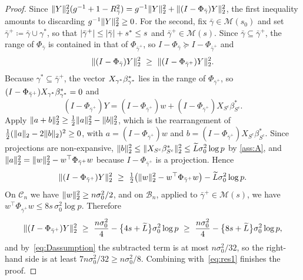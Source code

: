 \begin{proof}
    Since $\lVert Y\rVert_2^{2}(g^{-1}+1-R^{2}_{\bar\gamma})
    =g^{-1}\lVert Y\rVert_2^{2}+\lVert(I-\Phi_{\bar\gamma})Y\rVert_2^{2}$, the first
    inequality amounts to discarding $g^{-1}\lVert Y\rVert_2^{2}\geq0$. For the
    second, fix $\bar\gamma\in\mathscr{M}(s_0)$ and set
    $\bar\gamma^{+}\coloneq\bar\gamma\cup\gamma^{\ast}$, so that
    $\lvert\bar\gamma^{+}\rvert\leq\lvert\bar\gamma\rvert+s^{\ast}\leq s$ and
    $\bar\gamma^{+}\in\mathscr{M}(s)$. Since
    $\bar\gamma\subseteq\bar\gamma^{+}$, the range of $\Phi_{\bar\gamma}$
    is contained in that of $\Phi_{\bar\gamma^{+}}$, so
    $I-\Phi_{\bar\gamma}\succcurlyeq I-\Phi_{\bar\gamma^{+}}$ and
    \begin{equation}
        \label{eq:res1}
        \lVert(I-\Phi_{\bar\gamma})Y\rVert_2^{2}
        \ \geq\ \lVert(I-\Phi_{\bar\gamma^{+}})Y\rVert_2^{2}.
    \end{equation}
    Because $\gamma^{\ast}\subseteq\bar\gamma^{+}$, the vector $X_{\gamma^{\ast}}\beta^{\ast}_{\gamma^{\ast}}$
    lies in the range of $\Phi_{\bar\gamma^{+}}$, so
    $(I-\Phi_{\bar\gamma^{+}})X_{\gamma^{\ast}}\beta^{\ast}_{\gamma^{\ast}}=0$ and
    \begin{equation*}
    (I-\Phi_{\bar\gamma^{+}})
        Y
        =(I-\Phi_{\bar\gamma^{+}})w
        +(I-\Phi_{\bar\gamma^{+}})X_{S^{c}}\beta^\ast_{S^{c}} .
    \end{equation*}
    Apply $\lVert a+b\rVert_2^{2}\geq\tfrac12\lVert a\rVert_2^{2}-\lVert b\rVert_2^{2}$, which
    is the rearrangement of $\tfrac12(\lVert a\rVert_2-2\lVert b\rVert_2)^{2}\geq0$,
    with $a=(I-\Phi_{\bar\gamma^{+}})w$ and
    $b=(I-\Phi_{\bar\gamma^{+}})X_{S^{c}}\beta^\ast_{S^{c}}$. Since
    projections are non-expansive, $\lVert b\rVert_2^{2}\leq
    \lVert X_{S^{c}}\beta^\ast_{S^{c}}\rVert_2^{2}\leq\widetilde{L}\sigma_0^{2}\log p$
    by \cref{ass:A}, and $\lVert a\rVert_2^{2}=\lVert w\rVert_2^{2}
    -w^{\top}\Phi_{\bar\gamma^{+}}w$ because $I-\Phi_{\bar\gamma^+}$ is a
    projection. Hence
    \begin{equation*}
        \lVert(I-\Phi_{\bar\gamma^{+}})Y\rVert_2^{2}
        \ \geq\ \tfrac12\bigl(\lVert w\rVert_2^{2}
        -w^{\top}\Phi_{\bar\gamma^{+}}w\bigr)
        -\widetilde{L}\sigma_0^{2}\log p .
    \end{equation*}
    On $\mathcal{C}_n$ we have $\lVert w\rVert_2^{2}\geq n\sigma_0^{2}/2$, and on
    $\mathcal{B}_n$, applied to $\bar\gamma^{+}\in\mathscr{M}(s)$, we have
    $w^{\top}\Phi_{\bar\gamma^{+}}w\leq 8s\,\sigma_0^{2}\log p$.
    Therefore
    \begin{equation*}
        \lVert(I-\Phi_{\bar\gamma^{+}})Y\rVert_2^{2}
        \ \geq\ \frac{n\sigma_0^{2}}{4}
        -\bigl\{4s+\widetilde{L}\bigr\}\sigma_0^{2}\log p
        \ \geq\ \frac{n\sigma_0^{2}}{4}
        -\bigl\{8s+\widetilde{L}\bigr\}\sigma_0^{2}\log p ,
    \end{equation*}
    and by~\eqref{eq:Dassumption} the subtracted term is at most
    $n\sigma_0^{2}/32$, so the right-hand side is at least
    $7n\sigma_0^{2}/32\geq n\sigma_0^{2}/8$. Combining
    with~\eqref{eq:res1} finishes the proof.
\end{proof}


